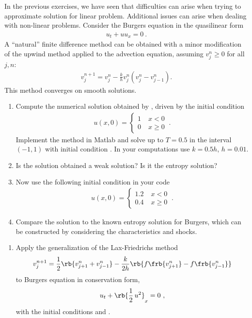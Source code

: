 \documentclass{article}
\begin{document}
\begin{exerciseList}
\item
In the previous exercises, we have seen that difficulties can arise when trying to approximate solution for linear problem. Additional issues can arise when dealing with non-linear problems. Consider the Burgers equation in the quasilinear form
\begin{gather} \label{quasiLinBurg}
	u_{t}+uu_{x}=0\ .
\end{gather}
A ``natural'' finite difference method can be obtained with a minor modification of the upwind method applied to the advection equation, assuming $v_{j}^{n}\geq0$ for all $j,n$:
\begin{gather} \label{quasiLinUpWind}
	v_{j}^{n+1}=v_{j}^{n}-\frac{k}{h}v_{j}^{n}\left(v_{j}^{n} -v_{j-1}^{n}\right).
\end{gather}
This method converges on smooth solutions.
\begin{enumerate}
\item
Compute the numerical solution obtained by , driven by the initial condition
\begin{gather} \label{inCond1}
	u(x,0)=\begin{cases}
			1\; & x<0\\
			0\; & x\geq0
		\end{cases}\ .
\end{gather}
Implement the method in Matlab and solve  up to $T=0.5$ in the interval $(-1,1)$ with initial condition . In your computations use $k=0.5h$, $h=0.01$.


\item
Is the solution obtained a weak solution? Is it the entropy
solution?

\item
Now use the following initial condition in your code 
\begin{gather} \label{inCond2}
	u\left(x,0\right)=\begin{cases}
			1.2\; & x<0\\
			0.4\; & x\geq0
		\end{cases}\ .
\end{gather}

\item
Compare the solution to the known entropy solution for Burgers, which can be constructed by considering the characteristics and shocks.
\end{enumerate}


\item
\begin{enumerate}
\item
Apply the generalization of the Lax-Friedrichs method
\begin{gather}
	v_{j}^{n+1}=\frac{1}{2}\rb{v_{j+1}^{n}+v_{j-1}^{n}}
		-\frac{k}{2h}\rb{f\frb{v_{j+1}^{n}}-f\frb{v_{j-1}^{n}}}
\end{gather}
to Burgers equation in conservation form,
\begin{gather}
	u_t+\rb{\frac{1}{2}\, u^2}_x=0\ ,
\end{gather}
with the initial conditions  and .


\end{enumerate}
\end{exerciseList}
\end{document}
